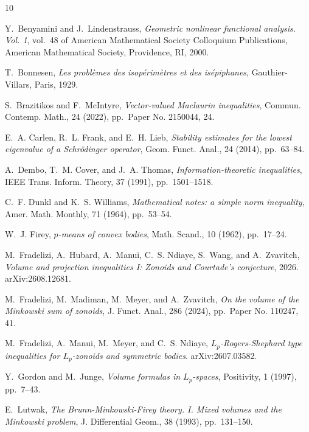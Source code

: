 \documentclass[11pt,a4paper]{amsart}
\theoremstyle{plain}
\theoremstyle{definition}
\begin{document}
% 
% 
\begin{thebibliography}{10}

{\sc Y.~Benyamini and J.~Lindenstrauss}, {\em Geometric nonlinear functional analysis. {V}ol. 1}, vol.~48 of American Mathematical Society Colloquium Publications, American Mathematical Society, Providence, RI, 2000.

{\sc T.~Bonnesen}, {\em Les probl{\`e}mes des isop{\'e}rim{\`e}tres et des is{\'e}piphanes}, Gauthier-Villars, Paris, 1929.

{\sc S.~Brazitikos and F.~McIntyre}, {\em Vector-valued {M}aclaurin inequalities}, Commun. Contemp. Math., 24 (2022), pp.~Paper No. 2150044, 24.

{\sc E.~A. Carlen, R.~L. Frank, and E.~H. Lieb}, {\em Stability estimates for the lowest eigenvalue of a {S}chr\"odinger operator}, Geom. Funct. Anal., 24 (2014), pp.~63--84.

{\sc A.~Dembo, T.~M. Cover, and J.~A. Thomas}, {\em Information-theoretic inequalities}, IEEE Trans. Inform. Theory, 37 (1991), pp.~1501--1518.

{\sc C.~F. Dunkl and K.~S. Williams}, {\em Mathematical notes: a simple norm inequality}, Amer. Math. Monthly, 71 (1964), pp.~53--54.

{\sc W.~J. Firey}, {\em {$p$}-means of convex bodies}, Math. Scand., 10 (1962), pp.~17--24.

{\sc M.~Fradelizi, A.~Hubard, A.~Manui, C.~S. Ndiaye, S.~Wang, and A.~Zvavitch}, {\em Volume and projection inequalities {I}: Zonoids and {C}ourtade's conjecture}, 2026.
\newblock arXiv:2608.12681.

{\sc M.~Fradelizi, M.~Madiman, M.~Meyer, and A.~Zvavitch}, {\em On the volume of the {M}inkowski sum of zonoids}, J. Funct. Anal., 286 (2024), pp.~Paper No. 110247, 41.

{\sc M.~Fradelizi, A.~Manui, M.~Meyer, and C.~S. Ndiaye}, {\em {$L_p$}-{R}ogers-{S}hephard type inequalities for {$L_p$}-zonoids and symmetric bodies}.
\newblock arXiv:2607.03582.

{\sc Y.~Gordon and M.~Junge}, {\em Volume formulas in {$L_p$}-spaces}, Positivity, 1 (1997), pp.~7--43.

{\sc E.~Lutwak}, {\em The {B}runn-{M}inkowski-{F}irey theory. {I}. {M}ixed volumes and the {M}inkowski problem}, J. Differential Geom., 38 (1993), pp.~131--150.


\end{thebibliography}
\end{document}
